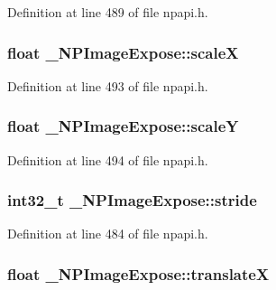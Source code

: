 Definition at line 489 of file npapi.h.

\hypertarget{struct___n_p_image_expose_a459e533407f02b3b01de9307a26acf70}{
\subsubsection[{scaleX}]{\setlength{\rightskip}{0pt plus 5cm}float {\bf \_\-NPImageExpose::scaleX}}}
\label{struct___n_p_image_expose_a459e533407f02b3b01de9307a26acf70}


Definition at line 493 of file npapi.h.

\hypertarget{struct___n_p_image_expose_a758b274482a925e928a9c452bf500ede}{
\subsubsection[{scaleY}]{\setlength{\rightskip}{0pt plus 5cm}float {\bf \_\-NPImageExpose::scaleY}}}
\label{struct___n_p_image_expose_a758b274482a925e928a9c452bf500ede}


Definition at line 494 of file npapi.h.

\hypertarget{struct___n_p_image_expose_a615500c6ef3cea7b86f61a02bd8dfbcf}{
\subsubsection[{stride}]{\setlength{\rightskip}{0pt plus 5cm}int32\_\-t {\bf \_\-NPImageExpose::stride}}}
\label{struct___n_p_image_expose_a615500c6ef3cea7b86f61a02bd8dfbcf}


Definition at line 484 of file npapi.h.

\hypertarget{struct___n_p_image_expose_a7ccc8c007a7033f1cf6620bf05d917c4}{
\subsubsection[{translateX}]{\setlength{\rightskip}{0pt plus 5cm}float {\bf \_\-NPImageExpose::translateX}}}
\label{struct___n_p_image_expose_a7ccc8c007a7033f1cf6620bf05d917c4}


